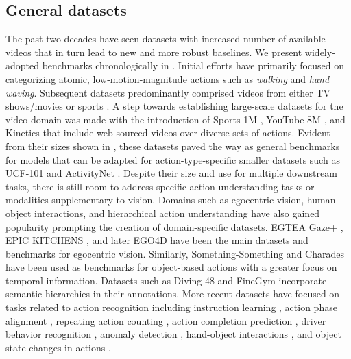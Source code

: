 \subsection{General datasets}
\label{sec:datasets::general}
The past two decades have seen datasets with increased number of available videos that in turn lead to new and more robust baselines. We present widely-adopted benchmarks chronologically in . Initial efforts \citep{schuldt2004recognizing,gorelick2007actions} have primarily focused on categorizing atomic, low-motion-magnitude actions such as \emph{walking} and \emph{hand waving}. Subsequent datasets predominantly comprised videos from either TV shows/movies \citep{laptev2007retrieving,laptev2008learning,marszalek2009actions,patron2010high,kuehne2011hmdb} or sports \citep{rodriguez2008action,liu2009recognizing,reddy2013recognizing,niebles2010modeling}. A step towards establishing large-scale datasets for the video domain was made with the introduction of Sports-1M \citep{karpathy2014large}, YouTube-8M \citep{abu2016youtube}, and Kinetics \citep{carreira2017quo} that include web-sourced videos over diverse sets of actions. Evident from their sizes shown in , these datasets paved the way as general benchmarks for models that can be adapted for action-type-specific smaller datasets such as UCF-101 \citep{soomro2012ucf101} and ActivityNet \citep{caba2015activitynet}. Despite their size and use for multiple downstream tasks, there is still room to address specific action understanding tasks or modalities supplementary to vision.  Domains such as 
egocentric vision, human-object interactions, and hierarchical action understanding have also gained popularity prompting the creation of domain-specific datasets. EGTEA Gaze+ \citep{li2015delving}, EPIC KITCHENS \citep{damen2022rescaling}, and later EGO4D \citep{grauman2022ego4d} have been the main datasets and benchmarks for egocentric vision. Similarly, Something-Something \citep{goyal2017something} and Charades \citep{sigurdsson2016hollywood} have been used as benchmarks for object-based actions with a greater focus on temporal information. Datasets such as Diving-48 \citep{li2018resound} and FineGym \citep{shao2020finegym} incorporate semantic hierarchies in their annotations. More recent datasets have focused on tasks related to action recognition including instruction learning \citep{alayrac2016unsupervised,bansal2022my,ben2021ikea,ohkawa2023assemblyhands,sener2022assembly101,tang2019coin}, action phase alignment \citep{sermanet2017unsupervised}, repeating action counting \citep{dwibedi2020counting,dwibedi2024ovr,hu2022transrac,runia2018real,zhang2020context}, action completion prediction \citep{epstein2020oops}, driver behavior recognition \citep{martin2019drive,ortega2020dmd}, anomaly detection \citep{acsintoae2022ubnormal,liu2018future,lu2013abnormal,sultani2018real,wu2020not}, hand-object interactions \citep{chao2021dexycb,garcia2018first,hampali2020honnotate,kwon2021h2o,moon2020interhand2,mueller2017real}, and object state changes in actions \citep{souvcek2022look}. 



